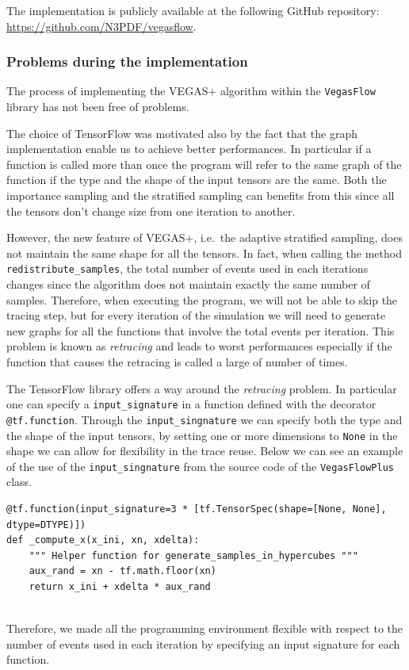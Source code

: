 \documentclass[../main/main.tex]{subfiles}
\begin{document}
The implementation is publicly available at the following GitHub repository: \url{https://github.com/N3PDF/vegasflow}.
\subsubsection{Problems during the implementation}
\label{vfp problem}
The process of implementing the VEGAS+ algorithm within the \texttt{VegasFlow} library has not been free of problems.

The choice of TensorFlow was motivated also by the fact that the graph implementation enable us to achieve better performances. In particular if a function is called more than once the program will refer to the same graph of the function if the type and the shape of the input tensors are the same.
Both the importance sampling and the stratified sampling can benefits from this since all the tensors don't change size from one iteration to another.

However, the new feature of VEGAS+, i.e.\ the adaptive stratified sampling, does not maintain the same shape for all the tensors.
In fact, when calling the method \texttt{redistribute\_samples}, the total number of events used in each iterations changes since the algorithm does not maintain exactly the same number of samples.
Therefore, when executing the program, we will not be able to skip the tracing step, but for every iteration of the simulation we will  need to generate new graphs for all the functions that involve the total events per iteration. This problem is known as \emph{retracing} and leads to worst performances especially if the function that causes the retracing is called a large of number of times.

The TensorFlow library offers a way around the \emph{retracing} problem.
In particular one can specify a \texttt{input\_signature} in a function defined with the decorator \texttt{@tf.function}.
Through the \texttt{input\_singnature} we can specify both the type and the shape of the input tensors, by setting one or more dimensions to \texttt{None} in the shape we can allow for flexibility in the trace reuse. Below we can see an example of the use of the \texttt{input\_singnature} from the source code of the \texttt{VegasFlowPlus} class.
\begin{verbatim}
@tf.function(input_signature=3 * [tf.TensorSpec(shape=[None, None], dtype=DTYPE)])
def _compute_x(x_ini, xn, xdelta):
	""" Helper function for generate_samples_in_hypercubes """
	aux_rand = xn - tf.math.floor(xn)
	return x_ini + xdelta * aux_rand
	
\end{verbatim}
Therefore, we made all the programming environment flexible with respect to the number of events used in each iteration by specifying an input signature for each function.
\end{document}
